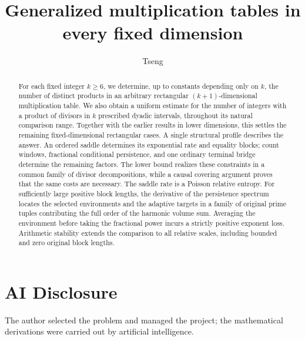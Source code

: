 \documentclass[11pt]{article}
\title{Generalized multiplication tables in every fixed dimension}
\author{Tseng}
\date{}
\numberwithin{equation}{section}
\theoremstyle{definition}
\theoremstyle{remark}
\begin{document}
\maketitle
\begin{abstract}
For each fixed integer $k\geq6$, we determine, up to constants depending
only on $k$, the number of distinct products in an arbitrary rectangular
$(k+1)$-dimensional multiplication table. We also obtain a uniform
estimate for the number of integers with a product of divisors in $k$
prescribed dyadic intervals, throughout its natural comparison range.
Together with the earlier results in lower dimensions, this settles the
remaining fixed-dimensional rectangular cases. A single structural
profile describes the answer. An ordered saddle determines its exponential
rate and equality blocks; count windows, fractional conditional
persistence, and one ordinary terminal bridge determine the remaining
factors. The lower bound realizes these constraints in a common family
of divisor decompositions, while a causal covering argument proves that
the same costs are necessary. The saddle rate is a Poisson relative
entropy. For sufficiently large positive block lengths, the derivative
of the persistence spectrum locates the selected environments and the
adaptive targets in a family of original prime tuples contributing the
full order of the harmonic volume sum. Averaging
the environment before taking the fractional power incurs a strictly
positive exponent loss. Arithmetic stability extends the comparison
to all relative scales, including bounded and zero original block lengths.
\end{abstract}
\tableofcontents















\appendix














\section*{AI Disclosure}
The author selected the problem and managed the project; the mathematical derivations were carried out by artificial intelligence.
\end{document}
